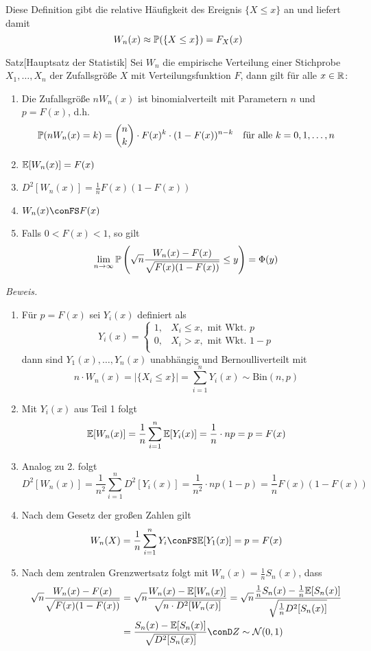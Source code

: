Diese Definition gibt die relative Häufigkeit des Ereignis $\{X\leq x\}$ an und liefert damit 
\[
    W_n(x)\approx \P(\{X\leq x\}) = F_X(x)
\]

\begin{colbox}{Satz}[Hauptsatz der Statistik]
    Sei $W_n$ die empirische Verteilung einer Stichprobe $X_1,\dots,X_n$ der Zufallsgröße $X$ mit 
    Verteilungsfunktion $F$, dann gilt für alle $x\in\R$:
    \begin{enumerate}
        \item Die Zufallsgröße $nW_n(x)$ ist binomialverteilt mit Parametern $n$ und $p=F(x)$, d.h.
        \[
            \P(nW_n(x)=k) = \binom{n}{k}\cdot F(x)^k\cdot (1-F(x))^{n-k} \quad \text{für alle } k=0,1,\dots,n
        \]
        \item $\E[W_n(x)] = F(x)$
        \item $D^2[W_n(x)] = \tfrac{1}{n}F(x)(1-F(x))$
        \item $W_n(x)\conFS F(x)$
        \item Falls $0<F(x)<1$, so gilt 
        \[
            \lim_{n\to\infty} \P\left(\sqrt{n}\dfrac{W_n(x)-F(x)}{\sqrt{F(x)(1-F(x))}}\leq y\right) = \Phi(y)
        \]
    \end{enumerate}
\end{colbox}
\textit{Beweis.}
\begin{enumerate}
    \item Für $p=F(x)$ sei $Y_i(x)$ definiert als 
    \[
        Y_i(x) = \begin{cases}
            1, & X_i \leq x, \text{ mit Wkt. } p \\
            0, & X_i > x, \text{ mit Wkt. } 1-p \\
        \end{cases}
    \]
    dann sind $Y_1(x),\dots,Y_n(x)$ unabhängig und Bernoulliverteilt mit 
    \[
        n\cdot W_n(x) = |\{X_i\leq x\}| = \sum_{i=1}^{n} Y_i(x)\sim\mathrm{Bin}(n,p)
    \]
    \item Mit $Y_i(x)$ aus Teil 1 folgt
    \[
        \E[W_n(x)] = \dfrac{1}{n}\sum_{i=1}^{n}\E[Y_i(x)] = \dfrac{1}{n}\cdot np = p = F(x)
    \]
    \item Analog zu 2. folgt 
    \[
        D^2[W_n(x)] = \dfrac{1}{n^2}\sum_{i=1}^{n}D^2[Y_i(x)] = \dfrac{1}{n^2}\cdot np(1-p) = \dfrac{1}{n}F(x)(1-F(x))
    \]
    \item Nach dem Gesetz der großen Zahlen gilt
    \[
        W_n(X) = \dfrac{1}{n}\sum_{i=1}^{n} Y_i \conFS \E[Y_1(x)] = p = F(x)
    \]
    \item Nach dem zentralen Grenzwertsatz folgt mit $W_n(x)=\tfrac{1}{n}S_n(x)$, dass 
    \begin{align*}
        \sqrt{n}\dfrac{W_n(x)-F(x)}{\sqrt{F(x)(1-F(x))}} 
        &= \sqrt{n}\dfrac{W_n(x)-\E[W_n(x)]}{\sqrt{n\cdot D^2[W_n(x)]}} 
        = \sqrt{n}\dfrac{\tfrac{1}{n}S_n(x)-\tfrac{1}{n}\E[S_n(x)]}{\sqrt{\tfrac{1}{n}D^2[S_n(x)]}}\\
        &= \dfrac{S_n(x)-\E[S_n(x)]}{\sqrt{D^2[S_n(x)]}} 
        \conD Z\sim\mathcal{N}(0,1)
    \end{align*}
\end{enumerate}

